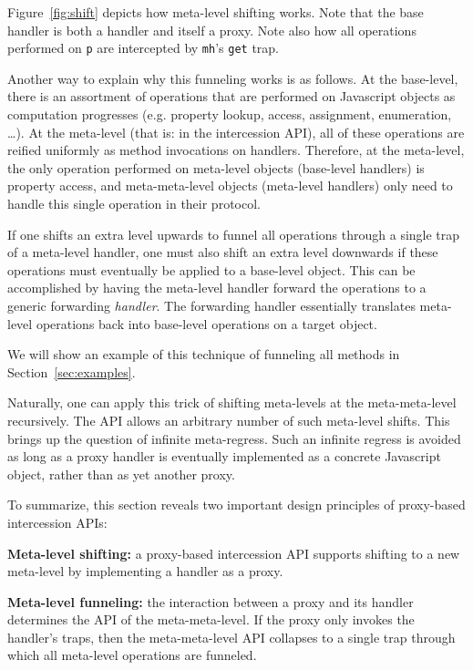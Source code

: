 \documentclass{acm_proc_article-sp}
\begin{document}
Figure~\ref{fig:shift} depicts how meta-level shifting works. Note that the base handler is both a handler and itself a proxy. Note also how all operations performed on \texttt{p} are intercepted by \texttt{mh}'s \texttt{get} trap.

Another way to explain why this funneling works is as follows. At the base-level, there is an assortment of operations that are performed on Javascript objects as computation progresses (e.g. property lookup, access, assignment, enumeration, \ldots). At the meta-level (that is: in the intercession API), all of these operations are reified uniformly as method invocations on handlers. Therefore, at the meta-level, the only operation performed on meta-level objects (base-level handlers) is property access, and meta-meta-level objects (meta-level handlers) only need to handle this single operation in their protocol.

If one shifts an extra level upwards to funnel all operations through a single trap of a meta-level handler, one must also shift an extra level downwards if these operations must eventually be applied to a base-level object. This can be accomplished by having the meta-level handler forward the operations to a generic forwarding \emph{handler}. The forwarding handler essentially translates meta-level operations back into base-level operations on a target object.

We will show an example of this technique of funneling all methods in Section~\ref{sec:examples}.

Naturally, one can apply this trick of shifting meta-levels at the meta-meta-level recursively. The API allows an arbitrary number of such meta-level shifts. This brings up the question of infinite meta-regress. Such an infinite regress is avoided as long as a proxy handler is eventually implemented as a concrete Javascript object, rather than as yet another proxy.

To summarize, this section reveals two important design principles of proxy-based intercession APIs:

\textbf{Meta-level shifting:} a proxy-based intercession API supports shifting to a new meta-level by implementing a handler as a proxy.

\textbf{Meta-level funneling:} the interaction between a proxy and its handler determines the API of the meta-meta-level. If the proxy only invokes the handler's traps, then the meta-meta-level API collapses to a single trap through which all meta-level operations are funneled.
\end{document}
